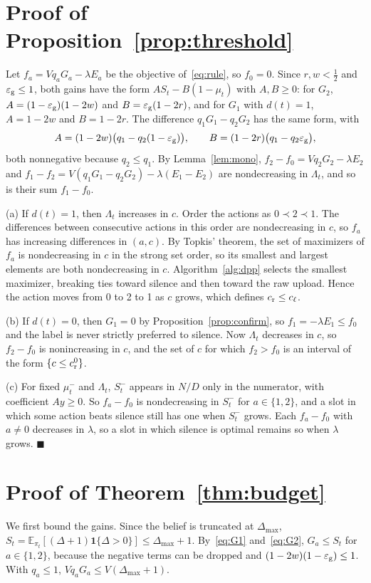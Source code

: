 \documentclass[5p,twocolumn]{elsarticle}
\theoremstyle{remark}
\newcommand{\E}{\mathbb{E}}
\newcommand{\ind}[1]{\mathbf{1}\{#1\}}
\newcommand{\lab}{\ell}
\newcommand{\ee}{\varepsilon}
\begin{document}
\section{Proof of Proposition~\ref{prop:threshold}}\label{app:threshold}
Let $f_a=Vq_aG_a-\lambda E_a$ be the objective of~\eqref{eq:rule}, so $f_0=0$. Since $r,w<\frac12$ and $\ee_{\rm g}\le1$, both gains have the form $AS_t-B(1-\mu_t)$ with $A,B\ge0$: for $G_2$, $A=(1-\ee_{\rm g})(1-2w)$ and $B=\ee_{\rm g}(1-2r)$, and for $G_1$ with $d(t)=1$, $A=1-2w$ and $B=1-2r$. The difference $q_1G_1-q_2G_2$ has the same form, with
\[
A=(1-2w)\big(q_1-q_2(1-\ee_{\rm g})\big),\qquad B=(1-2r)\big(q_1-q_2\ee_{\rm g}\big),
\]
both nonnegative because $q_2\le q_1$. By Lemma~\ref{lem:mono}, $f_2-f_0=Vq_2G_2-\lambda E_2$ and $f_1-f_2=V(q_1G_1-q_2G_2)-\lambda(E_1-E_2)$ are nondecreasing in $\Lambda_t$, and so is their sum $f_1-f_0$.

(a) If $d(t)=1$, then $\Lambda_t$ increases in $c$. Order the actions as $0\prec2\prec1$. The differences between consecutive actions in this order are nondecreasing in $c$, so $f_a$ has increasing differences in $(a,c)$. By Topkis' theorem, the set of maximizers of $f_a$ is nondecreasing in $c$ in the strong set order, so its smallest and largest elements are both nondecreasing in $c$. Algorithm~\ref{alg:dpp} selects the smallest maximizer, breaking ties toward silence and then toward the raw upload. Hence the action moves from 0 to 2 to 1 as $c$ grows, which defines $c_{\rm r}\le c_{\lab}$.

(b) If $d(t)=0$, then $G_1=0$ by Proposition~\ref{prop:confirm}, so $f_1=-\lambda E_1\le f_0$ and the label is never strictly preferred to silence. Now $\Lambda_t$ decreases in $c$, so $f_2-f_0$ is nonincreasing in $c$, and the set of $c$ for which $f_2>f_0$ is an interval of the form $\{c\le c^0_{\rm r}\}$.

(c) For fixed $\mu^-_t$ and $\Lambda_t$, $S^-_t$ appears in $N/D$ only in the numerator, with coefficient $Ay\ge0$. So $f_a-f_0$ is nondecreasing in $S^-_t$ for $a\in\{1,2\}$, and a slot in which some action beats silence still has one when $S^-_t$ grows. Each $f_a-f_0$ with $a\neq0$ decreases in $\lambda$, so a slot in which silence is optimal remains so when $\lambda$ grows. \hfill$\blacksquare$

\section{Proof of Theorem~\ref{thm:budget}}\label{app:budget}
We first bound the gains. Since the belief is truncated at $\Delta_{\max}$, $S_t=\E_{\pi_t}[(\Delta+1)\ind{\Delta>0}]\le\Delta_{\max}+1$. By~\eqref{eq:G1} and~\eqref{eq:G2}, $G_a\le S_t$ for $a\in\{1,2\}$, because the negative terms can be dropped and $(1-2w)(1-\ee_{\rm g})\le1$. With $q_a\le1$, $Vq_aG_a\le V(\Delta_{\max}+1)$.
\end{document}
